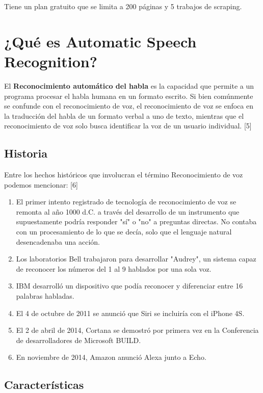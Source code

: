 \documentclass[twocolumn]{article}
\begin{document}
Tiene un plan gratuito que se limita a 200 páginas y 5 trabajos de scraping.

\section{¿Qué es Automatic Speech Recognition?}

El \textbf{Reconocimiento automático del habla} es la capacidad que permite a un programa procesar el habla humana en un formato escrito. Si bien comúnmente se confunde con el reconocimiento de voz, el reconocimiento de voz se enfoca en la traducción del habla de un formato verbal a uno de texto, mientras que el reconocimiento de voz solo busca identificar la voz de un usuario individual. [5]

\subsection{Historia}

Entre los hechos históricos que involucran el término Reconocimiento de voz podemos mencionar: [6]

\begin{enumerate}
  \item El primer intento registrado de tecnología de reconocimiento de voz se remonta al año 1000 d.C. a través del desarrollo de un instrumento que supuestamente podría responder "sí" o "no" a preguntas directas. No contaba con un procesamiento de lo que se decía, solo que el lenguaje natural desencadenaba una acción.
  \item Los laboratorios Bell trabajaron para desarrollar "Audrey", un sistema capaz de reconocer los números del 1 al 9 hablados por una sola voz.
  \item IBM desarrolló un dispositivo que podía reconocer y diferenciar entre 16 palabras habladas.
  \item El 4 de octubre de 2011 se anunció que Siri se incluiría con el iPhone 4S.
  \item El 2 de abril de 2014, Cortana se demostró por primera vez en la Conferencia de desarrolladores de Microsoft BUILD.
  \item En noviembre de 2014, Amazon anunció Alexa junto a Echo.
\end{enumerate}

\subsection{Características}
\end{document}
